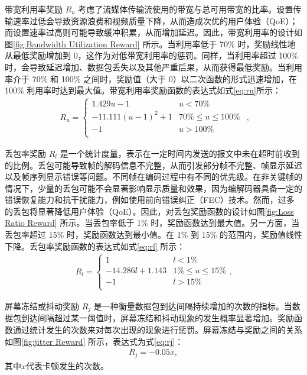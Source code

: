 带宽利用率奖励 $R_u$ 考虑了流媒体传输流使用的带宽与总可用带宽的比率。设置传输速率过低会导致资源浪费和视频质量下降，从而造成次优的用户体验（QoE）；而设置速率过高则可能导致缓冲积累，从而增加延迟。因此，带宽利用率的设计如图\ref{fig:Bandwidth Utilization Reward} 所示。当利用率低于 70\% 时，奖励线性地从最低奖励增加到 0，这作为对低带宽利用率的惩罚。同样，当利用率超过 100\% 时，会导致延迟增加、数据包丢失以及其他严重后果，从而获得最低奖励。当利用率介于 70\% 和 100\% 之间时，奖励值（大于 0）以二次函数的形式迅速增加，在 100\% 利用率时达到最大值。带宽利用率奖励函数的表达式如式\eqref{eq:ru}所示：
\begin{equation}
\begin{aligned}
R_{u} = 
    \begin{cases}
        1.429u - 1 & u < 70\%\\
        -11.111(u-1)^2 +1&  70\% \leq u \leq 100\% \\
        -1 & u > 100\%\\
    \end{cases}
\end{aligned}
,
\label{eq:ru}
\end{equation}

丢包率奖励 $R_l$ 是一个统计度量，表示在一定时间内发送的报文中未在超时前收到的比例。丢包可能导致帧的解码信息不完整，从而引发部分帧不完整、帧显示延迟以及帧序列显示错误等问题。不同帧在编码过程中有不同的优先级。在非关键帧的情况下，少量的丢包可能不会显著影响显示质量和效果，因为编解码器具备一定的错误恢复能力和抗干扰能力，例如使用前向错误纠正（FEC）技术。然而，过多的丢包将显著降低用户体验（QoE）。因此，对丢包奖励函数的设计如图\ref{fig:Loss Ratio Reward} 所示。当丢包率低于 1\% 时，奖励函数达到最大值。另一方面，当丢包率超过 15\% 时，奖励函数达到最小值。在 1\% 到 15\% 的范围内，奖励值线性下降。丢包率奖励函数的表达式如式\eqref{eq:rl} 所示：
\begin{equation}
\begin{aligned}
R_{l} = 
    \begin{cases}
        1 & l < 1\%\\
        -14.286l + 1.143&  1\% \leq u \leq 15\% \\
        -1 & l > 15\%\\
    \end{cases}.
\end{aligned}
\label{eq:rl}
\end{equation}

屏幕冻结或抖动奖励 $R_j$ 是一种衡量数据包到达间隔持续增加的次数的指标。当数据包到达间隔超过某一阈值时，屏幕冻结和抖动现象的发生概率显著增加。奖励函数通过统计发生的次数来对每次出现的现象进行惩罚。屏幕冻结与奖励之间的关系如图\ref{fig:jitter Reward} 所示，表达式为式\eqref{eq:rj}：
\begin{equation}
\begin{aligned}
R_{j} = -0.05x,
\end{aligned}
\label{eq:rj}
\end{equation}
其中$x$代表卡顿发生的次数。

